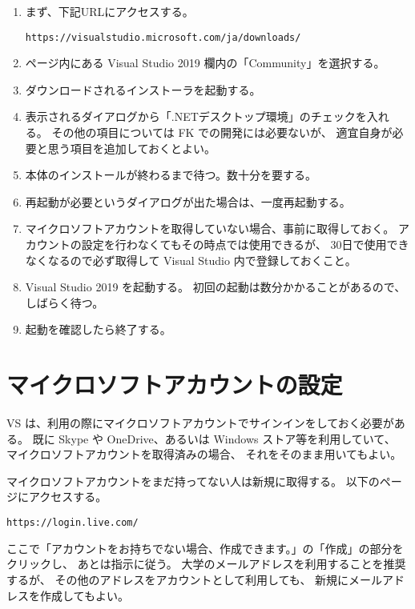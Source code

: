 \documentclass[a4paper]{jsarticle}
\begin{document}
\begin{enumerate}
 \item まず、下記URLにアクセスする。
  \begin{screen}
  \begin{center}
	\verb+https://visualstudio.microsoft.com/ja/downloads/+
  \end{center}
  \end{screen}

 \item ページ内にある Visual Studio 2019 欄内の「Community」を選択する。

 \item ダウンロードされるインストーラを起動する。

 \item 表示されるダイアログから「.NETデスクトップ環境」のチェックを入れる。
	その他の項目については FK での開発には必要ないが、
	適宜自身が必要と思う項目を追加しておくとよい。

 \item 本体のインストールが終わるまで待つ。数十分を要する。

 \item 再起動が必要というダイアログが出た場合は、一度再起動する。

 \item マイクロソフトアカウントを取得していない場合、事前に取得しておく。
	アカウントの設定を行わなくてもその時点では使用できるが、
	30日で使用できなくなるので必ず取得して Visual Studio 内で登録しておくこと。

 \item Visual Studio 2019 を起動する。
	初回の起動は数分かかることがあるので、しばらく待つ。

 \item 起動を確認したら終了する。

\end{enumerate}

\section{マイクロソフトアカウントの設定}

VS は、利用の際にマイクロソフトアカウントでサインインをしておく必要がある。
既に Skype や OneDrive、あるいは Windows ストア等を利用していて、
マイクロソフトアカウントを取得済みの場合、
それをそのまま用いてもよい。

マイクロソフトアカウントをまだ持ってない人は新規に取得する。
以下のページにアクセスする。
\begin{screen}
\begin{center}
	\verb+https://login.live.com/+
\end{center}
\end{screen}
ここで「アカウントをお持ちでない場合、作成できます。」の「作成」の部分をクリックし、
あとは指示に従う。
大学のメールアドレスを利用することを推奨するが、
その他のアドレスをアカウントとして利用しても、
新規にメールアドレスを作成してもよい。
\end{document}
